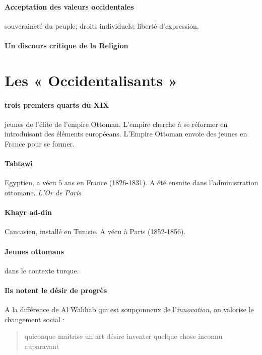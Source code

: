  \paragraph{Acceptation des valeurs occidentales} souveraineté du peuple; droits individuels; liberté d'expression. 
 
 \paragraph{Un discours critique de la Religion} 
 
  \section{Les « Occidentalisants »}
  
\paragraph{trois premiers quarts du XIX} jeunes de l'élite de l'empire Ottoman. L'empire cherche à se réformer en introduisant des éléments européeans. L'Empire Ottoman envoie des jeunes en France pour se former.

\paragraph{Tahtawi} Egyptien, a vécu 5 ans en France (1826-1831). A été ensuite dans l'administration ottomane. \textit{L'Or de Paris}

\paragraph{Khayr ad-din} Caucasien, installé en Tunisie. A vécu à Paris (1852-1856).

\paragraph{Jeunes ottomans} dans le contexte turque. 

\paragraph{Ils notent le désir de progrès} A la différence de Al Wahhab qui est soupçonneux de l'\textit{innovation}, on valorise le changement social : 
\begin{quote}
    quiconque maitrise un art désire inventer quelque chose inconnu auparavant 
\end{quote}

